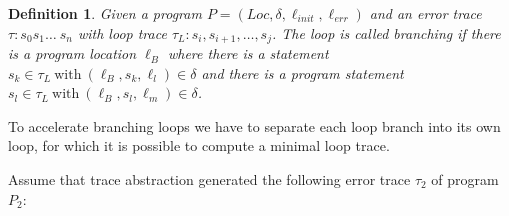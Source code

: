 \documentclass{article}
\newcommand{\Loc}{\ensuremath{\mathit{Loc}}\xspace}
\newcommand{\err}{\ensuremath{\mathit{err}}\xspace}
\newcommand{\init}{\ensuremath{\mathit{init}}\xspace}
\newcommand{\loc}[1]{\ensuremath{\ell_{#1}}}
\newtheorem{mydef}{Definition}
\newcommand\mycom[1]{}
\newcommand\mycom[1]{#1}
\newcommand{\dd}[1]{\mycom{\todo[color=orange!40,inline]{\small DD: #1}}}
\newcommand{\ts}[1]{\mycom{\todo[color=green!40,inline]{\small TS: #1}}}
\begin{document}
\begin{mydef}
	Given a
	program $P = (\Loc, \delta, \ell_\init, \ell_\err)$ and an
	error trace $\tau: s_0s_1\ldots\ s_n$ with
	loop trace $\tau_L: s_i, s_{i+1}, \ldots, s_j$.
	The loop is called branching if there is a program location $\loc{B}$
	where there is a statement $s_k \in \tau_L\ \text{with}\ (\loc{B}, s_k, \loc{l}) \in \delta$
	and there is a program statement $s_l \in \tau_L\  \text{with}\ (\loc{B}, s_l, \loc{m}) \in \delta$.
\end{mydef}
\dd{Makes no real sense, because the definition does not talk about a ``loop''}
To accelerate branching loops we have to separate each loop branch into its own loop, for which it is possible to compute a minimal loop trace.



Assume that trace abstraction generated the following error trace $\tau_2$ of program $P_2$:
\begin{figure}[H]
	\begin{center}
		
	\end{center}
\end{figure}
\dd{Note that this is not a trace -- a trace is a statement sequence}
\dd{When you use pictures or tables as text elements, they should not be floating figures and should not have their own captions. For traces, this is sometimes (usually?) appropriate}
\end{document}
